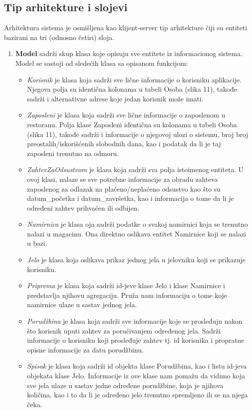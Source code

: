 \subsection{Tip arhitekture i slojevi}
Arhitektura sistema je osmišljena kao klijent-server tip arhitekture čiji su entiteti bazirani na tri (odnosno četiri) sloja.
\begin{enumerate}
    \item \textbf{Model} sadrži skup klasa koje opisuju sve entitete iz informacionog sistema. Model se sastoji od sledećih klasa sa opisanom funkcijom:
    \begin{itemize}
        \item \emph{Korisnik} je klasa koja sadrži sve lične informacije o korisniku aplikacije. Njegova polja su identična kolonama u tabeli Osoba (slika 11), takođe sadrži i alternativne adrese koje jedan korisnik može imati.
        \item \emph{Zaposleni} je klasa koja sadrži sve lične informacije o zaposlenom u restoranu. Polja klase Zaposleni identična su kolonama u tabeli Osoba (slika 11), takođe sadrži i informacije o njegovoj ulozi o sistemu, broj broj preostalih/iskorišćenih slobodnih dana, kao i podatak da li je taj zaposleni trenutno na odmoru.
        \item \emph{ZahtevZaOdsustvom} je klasa koja sadrži sva polja istoimenog entiteta. U ovoj klasi, nalaze se sve potrebne informacije za obradu zahteva zaposlenog za odlazak na plaćeno/neplaćeno odsustvo kao što su datum\_početka i datum\_završetka, kao i informacija o tome da li je određeni zahtev prihvaćen ili odbijen.
        \item \emph{Namirnica} je klasa oja sadrži podatke o svakoj namirnici koja se trenutno nalazi u magacinu. Ona direktno oslikava entitet Namirnice koji se nalazi u bazi.
         \item \emph{Jelo} je klasa koja oslikava prikaz jednog jela u jelovniku koji se prikazuje korisniku.
         \item \emph {Priprema} je klasa koja sadrži id-jeve klase Jelo i klase Namirnice i predstavlja njihovu agregaciju. Pruža nam informaciju o tome koje namirnice ulaze u sastav jednog jela.
         \item \emph{Porudžbina} je klasa koja sadrži sve informacije koje se prosleđuju nakon što korisnik uputi zahtev za poručivanjem određenog jela. Sadrži informacije o korisniku koji prosleđuje zahtev tj. id korisnika i propratne opisne informacije za datu porudžbinu.
         \item \emph{Spisak} je klasa koja sadrži id objekta klase Porudžbina, kao i listu id-jeva objekata klase Jelo. Informacije iz ove klase nam pomažu da vidimo koja sve jela ulaze u sastav jedne određene porudžbine, koja je njihova količina, kao i to da li je određeno jelo trenutno spremljeno ili se na njega čeka.

\end{itemize}
\end{enumerate}
